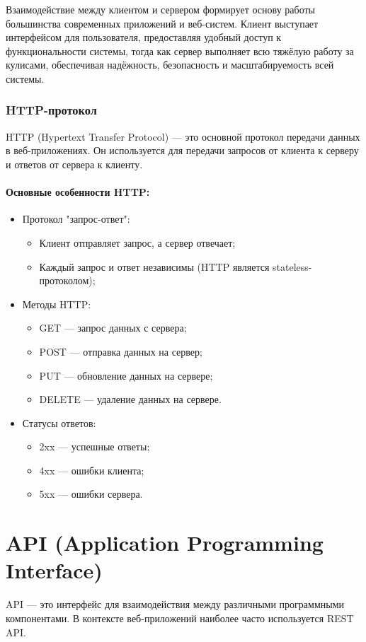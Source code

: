 Взаимодействие между клиентом и сервером формирует основу работы большинства современных приложений и веб-систем. Клиент выступает интерфейсом для пользователя, предоставляя удобный доступ к функциональности системы, тогда как сервер выполняет всю тяжёлую работу за кулисами, обеспечивая надёжность, безопасность и масштабируемость всей системы.

\subsubsection*{HTTP-протокол}

HTTP (Hypertext Transfer Protocol) — это основной протокол передачи данных в веб-приложениях. Он используется для передачи запросов от клиента к серверу и ответов от сервера к клиенту.

\paragraph{Основные особенности HTTP:}
\begin{itemize}
    \item Протокол "запрос-ответ":
    \begin{itemize}
        \item Клиент отправляет запрос, а сервер отвечает;
        \item Каждый запрос и ответ независимы (HTTP является stateless-протоколом);
    \end{itemize}
    \item Методы HTTP:
    \begin{itemize}
        \item GET — запрос данных с сервера;
        \item POST — отправка данных на сервер;
        \item PUT — обновление данных на сервере;
        \item DELETE — удаление данных на сервере.
    \end{itemize}
    \item Статусы ответов:
    \begin{itemize}
        \item 2xx — успешные ответы;
        \item 4xx — ошибки клиента;
        \item 5xx — ошибки сервера.
    \end{itemize}
\end{itemize}

\section{API (Application Programming Interface)}
API — это интерфейс для взаимодействия между различными программными компонентами. В контексте веб-приложений наиболее часто используется REST API.

